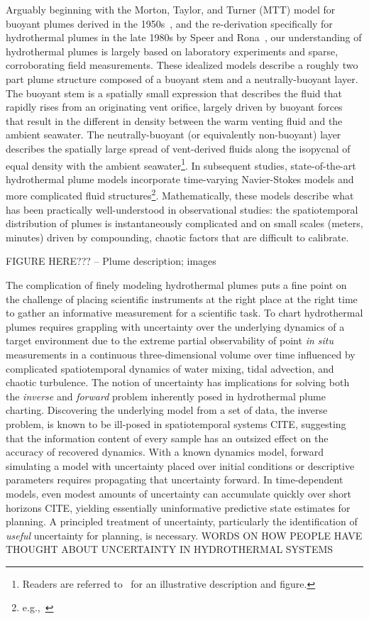 Arguably beginning with the Morton, Taylor, and Turner (MTT) model for buoyant plumes derived in the 1950s~\autocite{morton1956turbulent}, and the re-derivation specifically for hydrothermal plumes in the late 1980s by Speer and Rona~\autocite{speer1989model}, our understanding of hydrothermal plumes is largely based on laboratory experiments and sparse, corroborating field measurements.
These idealized models describe a roughly two part plume structure composed of a buoyant stem and a neutrally-buoyant layer. 
The buoyant stem is a spatially small expression that describes the fluid that rapidly rises from an originating vent orifice, largely driven by buoyant forces that result in the different in density between the warm venting fluid and the ambient seawater.
The neutrally-buoyant (or equivalently non-buoyant) layer describes the spatially large spread of vent-derived fluids along the isopycnal of equal density with the ambient seawater\footnote{Readers are referred to~\autocite{yoerger2007autonomous} for an illustrative description and figure.}. 
In subsequent studies, state-of-the-art hydrothermal plume models incorporate time-varying Navier-Stokes models and more complicated fluid structures\footnote{e.g.,~\autocite{lavelle2013turbulent,xu2012deep}}.
Mathematically, these models describe what has been practically well-understood in observational studies: the spatiotemporal distribution of plumes is instantaneously complicated and on small scales (meters, minutes) driven by compounding, chaotic factors that are difficult to calibrate.


FIGURE HERE??? -- Plume description; images


The complication of finely modeling hydrothermal plumes puts a fine point on the challenge of placing scientific instruments at the right place at the right time to gather an informative measurement for a scientific task.
To chart hydrothermal plumes requires grappling with uncertainty over the underlying dynamics of a target environment due to the extreme partial observability of point \emph{in situ} measurements in a continuous three-dimensional volume over time influenced by complicated spatiotemporal dynamics of water mixing, tidal advection, and chaotic turbulence.
The notion of uncertainty has implications for solving both the \emph{inverse} and \emph{forward} problem inherently posed in hydrothermal plume charting.
Discovering the underlying model from a set of data, the inverse problem, is known to be ill-posed in spatiotemporal systems CITE, suggesting that the information content of every sample has an outsized effect on the accuracy of recovered dynamics.
With a known dynamics model, forward simulating a model with uncertainty placed over initial conditions or descriptive parameters requires propagating that uncertainty forward.
In time-dependent models, even modest amounts of uncertainty can accumulate quickly over short horizons CITE, yielding essentially uninformative predictive state estimates for planning.
A principled treatment of uncertainty, particularly the identification of \emph{useful} uncertainty for planning, is necessary. 
WORDS ON HOW PEOPLE HAVE THOUGHT ABOUT UNCERTAINTY IN HYDROTHERMAL SYSTEMS

